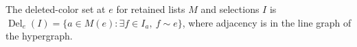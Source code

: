 \begin{definition}
The deleted-color set at $e$ for retained lists $M$ and selections $I$ is
$\operatorname{Del}_e(I)=\{a\in M(e):\exists f\in I_a,\ f\sim e\}$,
where adjacency is in the line graph of the hypergraph.
\end{definition}
